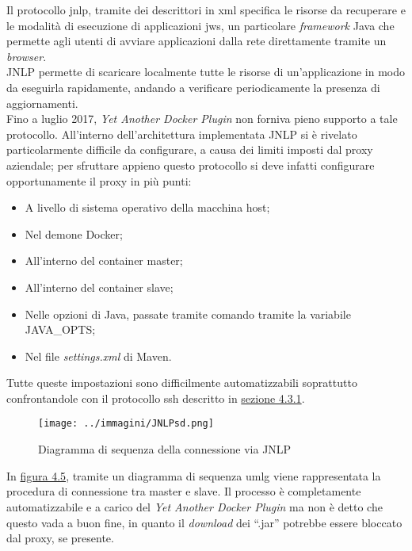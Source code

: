 Il protocollo \gls{jnlp}, tramite dei descrittori in \gls{xml} specifica le risorse da recuperare e le modalità di esecuzione di applicazioni \gls{jws}, un particolare \textit{framework} Java che permette agli utenti di avviare applicazioni dalla rete direttamente tramite un \textit{browser}. \\
JNLP permette di scaricare localmente tutte le risorse di un'applicazione in modo da eseguirla rapidamente, andando a verificare periodicamente la presenza di aggiornamenti. \\
Fino a luglio 2017, \textit{Yet Another Docker Plugin} non forniva pieno supporto a tale protocollo.
All'interno dell'architettura implementata JNLP si è rivelato particolarmente difficile da configurare, a causa dei limiti imposti dal proxy aziendale\cite{site:troubleshoot-jnlp}; per sfruttare appieno questo protocollo si deve infatti configurare opportunamente il proxy in più punti:

\begin{itemize}
    \item A livello di sistema operativo della macchina \gls{host};
    \item Nel \gls{demone} Docker;
    \item All'interno del \gls{container} master;
    \item All'interno del container slave;
    \item Nelle opzioni di Java, passate tramite comando tramite la variabile JAVA\_OPTS;
    \item Nel file \textit{settings.xml} di Maven\cite{site:maven-settings-reference}.
\end{itemize}

Tutte queste impostazioni sono difficilmente automatizzabili soprattutto confrontandole con il protocollo \gls{ssh} descritto in \hyperref[subsec:ssh]{sezione 4.3.1}.

\begin{figure}[H]
    \capstart
    \label{fig:jnlp-connection}
    \captionsetup{justification=centering}
    \centering
    \texttt{[image: ../immagini/JNLPsd.png]}
    \caption{Diagramma di sequenza della connessione via JNLP}
\end{figure}

In \hyperref[fig:jnlp-connection]{figura 4.5}, tramite un diagramma di sequenza \gls{umlg} viene rappresentata la procedura di connessione tra master e slave. Il processo è completamente automatizzabile e a carico del \textit{Yet Another Docker Plugin} ma non è detto che questo vada a buon fine, in quanto il \textit{download} dei ``.\gls{jar}'' potrebbe essere bloccato dal proxy, se presente.  